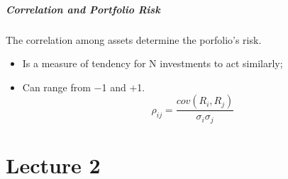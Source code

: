 \documentclass[11pt,a4paper]{report}
\begin{document}
\paragraph*{Correlation and Portfolio Risk}
The correlation among assets determine the porfolio's risk.
\begin{itemize}
    \item Is a measure of tendency for N investments to act similarly;
    \item Can range from $-$1 and $+$1.
    \[\rho_{ij} = \frac{cov(R_i,R_j)}{\sigma_i \sigma_j}\]
\end{itemize}

\chapter{Lecture 2}
\end{document}

